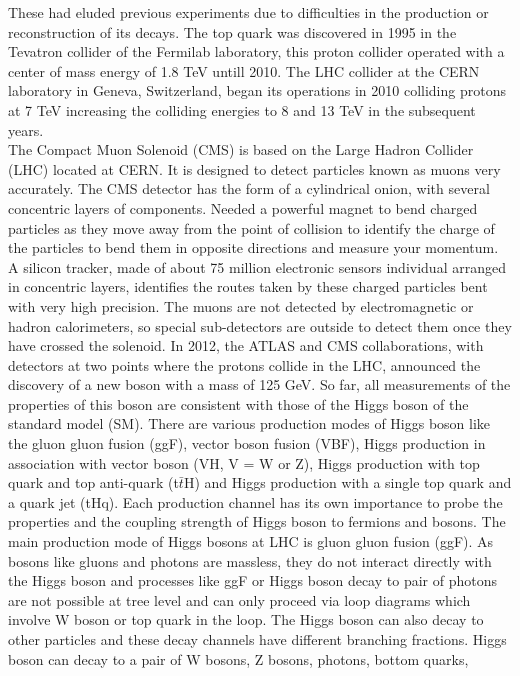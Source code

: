 \documentclass{article}
\begin{document}
These had eluded previous experiments due to difficulties in the production or reconstruction of its decays. The top quark was 
discovered in 1995 in the Tevatron collider of the Fermilab laboratory, this proton collider operated with a center of mass 
energy of 1.8 TeV untill 2010. The LHC collider at the CERN laboratory in Geneva, Switzerland, began its operations in 2010 
colliding protons at 7 TeV increasing the colliding energies to 8 and 13 TeV in the subsequent years.\\
The Compact Muon Solenoid (CMS) is based on the Large Hadron Collider (LHC) located at CERN. It is designed to detect 
particles known as muons very accurately. The CMS detector has the form of a cylindrical onion, with several concentric layers 
of components. Needed a powerful magnet to bend charged particles as they move away from the point of collision to identify 
the charge of the particles to bend them in opposite directions and measure your momentum. A silicon tracker, made of about 75 
million electronic sensors individual arranged in concentric layers, identifies the routes taken by these charged particles 
bent with very high precision. The muons are not detected by electromagnetic or hadron calorimeters, so special sub-detectors 
are outside to detect them once they have crossed the solenoid. In 2012, the ATLAS and CMS collaborations, with detectors at 
two points where the protons collide in the LHC, announced the discovery of a new boson with a mass of 125 GeV. So far, all 
measurements of the properties of this boson are consistent with those of the Higgs boson of the standard model (SM).
There are various production modes of Higgs boson like the gluon gluon fusion (ggF), vector boson fusion (VBF), Higgs 
production in association with vector boson (VH, V = W or Z), Higgs production with top quark and top anti-quark (t$\bar{t}$H) and Higgs 
production with a single top quark and a quark jet (tHq). Each production channel has its own importance to probe the 
properties and the coupling strength of Higgs boson to fermions and bosons. The main production mode of Higgs bosons at LHC is 
gluon gluon fusion (ggF). As bosons like gluons and photons are massless, they do not interact directly with the Higgs boson 
and processes like ggF or Higgs boson decay to pair of photons are not possible at tree level and can only proceed via loop 
diagrams which involve W boson or top quark in the loop. The Higgs boson can also decay to other particles and these decay 
channels have different branching fractions. Higgs boson can decay to a pair of W bosons, Z bosons, photons, bottom quarks, 
\end{document}
